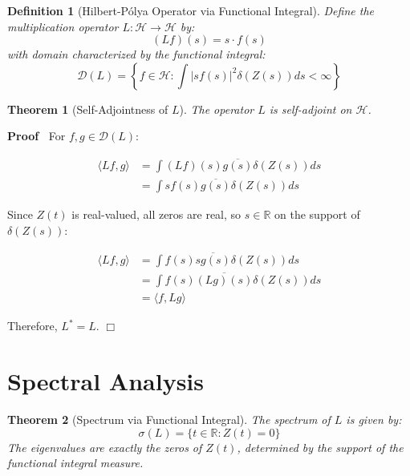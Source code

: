 \documentclass{article}
\newenvironment{proof}{\noindent\textbf{Proof\ }}{\hspace*{\fill}$\Box$\medskip}
\newtheorem{definition}{Definition}
\newtheorem{theorem}{Theorem}
\begin{document}
\begin{definition}
  [Hilbert-P{\'o}lya Operator via Functional Integral] Define the
  multiplication operator $L : \mathcal{H} \to \mathcal{H}$ by:
  \begin{equation}
    (Lf) (s) = s \cdot f (s)
  \end{equation}
  with domain characterized by the functional integral:
  \begin{equation}
    \mathcal{D} (L) = \left\{ f \in \mathcal{H}: \int |sf (s) |^2 \delta (Z
    (s)) ds < \infty \right\}
  \end{equation}
\end{definition}

\begin{theorem}
  [Self-Adjointness of $L$] The operator $L$ is self-adjoint on $\mathcal{H}$.
\end{theorem}

\begin{proof}
  For $f, g \in \mathcal{D} (L)$:
  
  \begin{align}
    \langle Lf, g \rangle & = \int (Lf) (s) \overline{g (s)} \delta (Z (s)) ds
    \\
    & = \int sf (s) \overline{g (s)} \delta (Z (s)) ds 
  \end{align}
  
  Since $Z (t)$ is real-valued, all zeros are real, so $s \in \mathbb{R}$ on
  the support of $\delta (Z (s))$:
  
  \begin{align}
    \langle Lf, g \rangle & = \int f (s) \overline{sg (s)} \delta (Z (s)) ds
    \\
    & = \int f (s) \overline{(Lg) (s)} \delta (Z (s)) ds \\
    & = \langle f, Lg \rangle 
  \end{align}
  
  Therefore, $L^{\ast} = L$.
\end{proof}

\section{Spectral Analysis}

\begin{theorem}
  [Spectrum via Functional Integral] The spectrum of $L$ is given by:
  \begin{equation}
    \sigma (L) = \{t \in \mathbb{R}: Z (t) = 0\}
  \end{equation}
  The eigenvalues are exactly the zeros of $Z (t)$, determined by the support
  of the functional integral measure.
\end{theorem}
\end{document}
